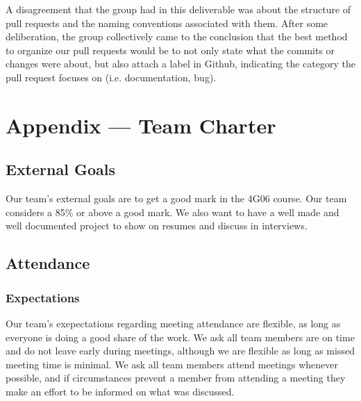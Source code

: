 \documentclass{article}
\begin{document}
A disagreement that the group had in this deliverable was about the structure
of pull requests and the naming conventions associated with them. After some
deliberation, the group collectively came to the conclusion that the best
method to organize our pull requests would be to not only state what the
commits or changes were about, but also attach a label in Github, indicating
the category the pull request focuses on (i.e. documentation, bug).

\newpage{}

\section*{Appendix --- Team Charter}


\subsection*{External Goals}


Our team's external goals are to get a good mark in the 4G06 course. Our team
considers a 85\% or above a good mark. We also want to have a well made and
well documented project to show on resumes and discuss in interviews.

\subsection*{Attendance}

\subsubsection*{Expectations}


Our team's exepectations regarding meeting attendance are flexible, as long as everyone is doing
a good share of the work. We ask all team members are on time and do not leave early during
meetings, although we are flexible as long as missed meeting time is minimal. We ask all team 
members attend meetings whenever possible, and if circumstances prevent a member from attending
a meeting they make an effort to be informed on what was discussed.
\end{document}
